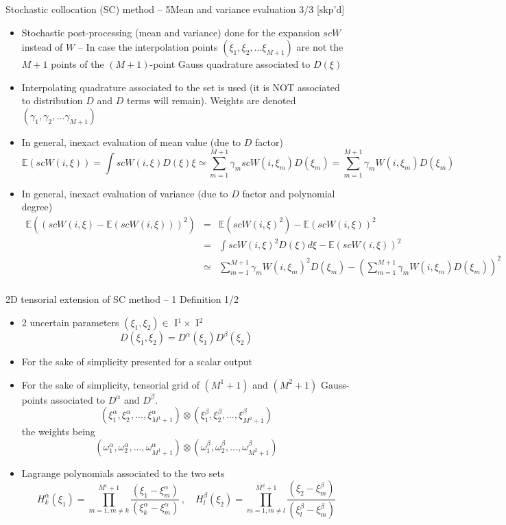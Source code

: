 \documentclass[10pt]{beamer}
\def\vo{\vspace{1mm}}
\def\vr{\vspace{3mm}}
\def\begit{\begin{itemize}}
\def\endit{\end{itemize}}
\def\beas{\begin{eqnarray*}}
\def\eeas{\end{eqnarray*}}
\def\Ir{{\textrm I}}
\newcommand{\esp}{{\mathbb E}}
\begin{document}
\begin{frame}{Stochastic collocation (SC) method -- 5}{Mean and variance evaluation 3/3 [skp'd]} 

\scriptsize{
%
\begit
\item Stochastic post-processing (mean and variance) done for the expansion $scW$ instead of $W$ -- In case the interpolation points $(\xi_1, \xi_2,\dots\xi_{M+1})$ are not the $M+1$ points of the $(M+1)$-point Gauss quadrature associated to $D(\xi)$
\vo
\item Interpolating quadrature associated to the set is used (it is NOT associated to distribution $D$ and $D$ terms will remain).
 Weights are denoted $(\gamma_1, \gamma_2,\dots\gamma_{M+1})$ 
\vr
\item In general, inexact evaluation of mean value (due to $D$ factor)
     $$ \esp(scW(i,\xi)) = \int scW(i,\xi) D(\xi) \xi \simeq \sum_{m=1}^{M+1}\gamma_m scW(i,\xi_m) D(\xi_m) = \sum_{m=1}^{M+1} \gamma_m W(i,\xi_m) D(\xi_m) $$ 
%
\item In general, inexact evaluation of variance (due to $D$ factor and polynomial degree)
  \beas
         \esp((scW(i,\xi)-\esp(scW(i,\xi)))^2) &=& \esp(scW(i,\xi)^2) -\esp(scW(i,\xi))^2 \\
                                     &=& \int scW(i,\xi)^2 D(\xi) d\xi -\esp(scW(i,\xi))^2 \\
                                     &\simeq& \sum_{m=1}^{M+1}\gamma_m W(i,\xi_m)^2 D(\xi_m) - \left( \sum_{m=1}^{M+1} \gamma_m W(i,\xi_m) D(\xi_m) \right)^2 \\
  \eeas
%
\endit
}
%
\end{frame} 
%
%
\begin{frame}{2D tensorial extension of SC method -- 1}{ Definition 1/2}
%
\footnotesize{
%
\begit
%
\item 2 uncertain parameters  $(\xi_1,\xi_2) \in$ \Ir$^1 \times$ \Ir$^2 $ 
%
                   $$ D(\xi_1,\xi_2) = D^{\alpha}(\xi_1)D^{\beta}(\xi_2)$$ 
%
\item For the sake of simplicity presented for a scalar output 
\item For the sake of simplicity, tensorial grid of $(M^1+1)$ and $(M^2+1)$ Gauss-points 
 associated to  $D^{\alpha}$ and $D^{\beta}$.
 $$  (\xi^\alpha_1, \xi^\alpha_2,...,\xi^\alpha_{M^1+1}) \otimes (\xi^\beta_1, \xi^\beta_2,...,\xi^\beta_{M^2+1})  $$
 the weights being 
%
 $$    (\omega^\alpha_1, \omega^\alpha_2,...,\omega^\alpha_{M^1+1})\otimes(\omega^\beta_1, \omega^\beta_2,...,\omega^\beta_{M^2+1})$$ 
%
\vo
\item Lagrange polynomials associated to the two sets
% 
  $$   H_k^\alpha(\xi_1) = \prod_{m=1, m\neq k}^{M^1+1} \displaystyle\frac{(\xi_1-\xi^\alpha_m)}{(\xi^\alpha_k-\xi^\alpha_m)}\,,\quad
  H_l^\beta(\xi_2) = \prod_{m=1, m\neq l}^{M^2+1} \displaystyle\frac{(\xi_2-\xi^\beta_m)}{(\xi^\beta_l-\xi^\beta_m)}        $$
%
\endit
%
}
%
\end{frame}
\end{document}
